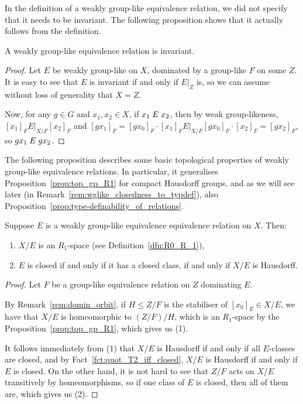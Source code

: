 	In the definition of a weakly group-like equivalence relation, we did not specify that it needs to be invariant. The following proposition shows that it actually follows from the definition.
	\begin{prop}
		A weakly group-like equivalence relation is
		invariant.
	\end{prop}
	\begin{proof}
		Let $E$ be weakly group-like on $X$, dominated by a group-like $F$ on some $Z$. It is easy to see that $E$ is invariant if and only if $E|_Z$ is, so we can assume without loss of generality that $X=Z$.
		
		Now, for any $g\in G$ and $x_1,x_2\in X$, if $x_1\mathrel{E} x_2$, then by weak group-likeness, $[x_1]_F \mathrel{E|_{X/F}} [x_2]_F$ and $[gx_1]_F=[gx_0]_F\cdot [x_1]_F\mathrel{E|_{X/F}} [gx_0]_F\cdot [x_2]_F=[gx_2]_F$, so $gx_1\mathrel{E} gx_2$.
	\end{proof}
	
	
	The following proposition describes some basic topological properties of weakly group-like equivalence relations. In particular, it generalises Proposition~\ref{prop:top_gp_R1} for compact Hausdorff groups, and as we will see later (in Remark~\ref{rem:wglike_closedness_to_typdef}), also Proposition~\ref{prop:type-definability_of_relations}.
	\begin{prop}
		\label{prop:top_props_of_wglike}
		Suppose $E$ is a weakly group-like equivalence equivalence relation on $X$. Then:
		\begin{enumerate}
			\item
			$X/E$ is an $R_1$-space (see Definition~\ref{dfn:R0_R_1}),
			\item
			$E$ is closed if and only if it has a closed class, if and only if $X/E$ is Hausdorff.
		\end{enumerate}
	\end{prop}
	\begin{proof}
		Let $F$ be a group-like equivalence relation on $Z$ dominating $E$.
		
		By Remark~\ref{rem:domin_orbit}, if $H\leq Z/F$ is the stabiliser of $[x_0]_E\in X/E$, we have that $X/E$ is homeomorphic to $(Z/F)/H$, which is an $R_1$-space by the Proposition~\ref{prop:top_gp_R1}, which gives us (1).
		
		It follows immediately from (1) that $X/E$ is Hausdorff if and only if all $E$-classes are closed, and by Fact~\ref{fct:quot_T2_iff_closed}, $X/E$ is Hausdorff if and only if $E$ is closed. On the other hand, it is not hard to see that $Z/F$ acts on $X/E$ transitively by homeomorphisms, so if one class of $E$ is closed, then all of them are, which gives us (2).
	\end{proof}
	
